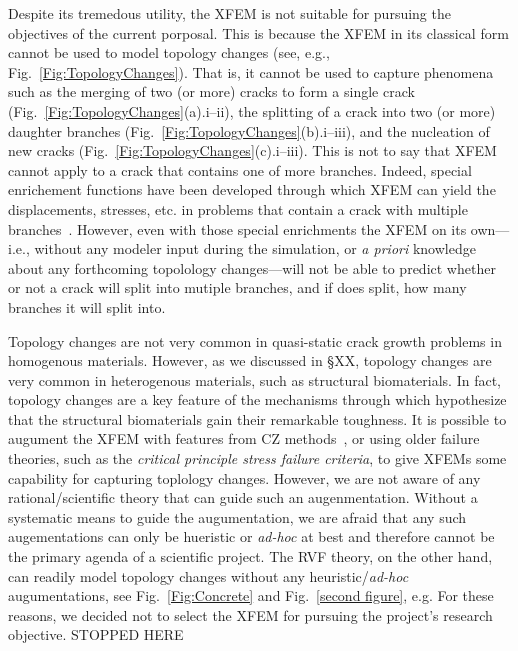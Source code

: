 \documentclass[12pt,onecolumn]{article}
\begin{document}
Despite its tremedous utility,  the XFEM is not suitable for pursuing the objectives of the current porposal.
This is  because  the XFEM in its classical form cannot  be used to  model topology changes (see, e.g., Fig.~\ref{Fig:TopologyChanges}). That is, it cannot  be used to capture phenomena such as  the merging of two (or more)  cracks to  form a single crack (Fig.~\ref{Fig:TopologyChanges}(a).i--ii), the splitting of a crack into two (or more)  daughter branches (Fig.~\ref{Fig:TopologyChanges}(b).i--iii), and  the nucleation of new cracks (Fig.~\ref{Fig:TopologyChanges}(c).i--iii).  This is not to say that XFEM cannot  apply to a crack that contains one of more branches. Indeed, special  enrichement functions have been developed through which  XFEM  can yield  the  displacements, stresses, etc.  in  problems that contain a crack with  multiple branches~\cite{daux2000arbitrary,belytschko2001arbitrary}. However, even  with those special enrichments  the XFEM  on its own---i.e., without any modeler input during the simulation, or \textit{a priori} knowledge about any  forthcoming topolology changes---will not be able to predict whether or not a  crack will split into mutiple branches, and if does split, how many branches it will split into.%


Topology changes are not very common in quasi-static crack growth problems in homogenous materials. However, as we discussed in \S XX,  topology changes are very common in heterogenous materials, such  as structural biomaterials. In fact,  topology changes are a key feature of the  mechanisms  through which  hypothesize that the structural biomaterials  gain their remarkable   toughness. It is possible to augument the XFEM with features from  CZ methods~\cite{wells2001new,moes2002extended,mariani2003extended}, or using older failure theories, such as the  \textit{critical principle stress failure criteria}, to give XFEMs some capability  for capturing toplology changes. However, we are not aware of any rational/scientific  theory that can guide such an augenmentation. Without a systematic means  to  guide the augumentation, we are afraid  that any such augementations can only be  hueristic or \textit{ad-hoc}  at best and therefore cannot be the primary agenda of a scientific project. The  RVF theory, on the other hand, can readily model topology  changes without any heuristic/\textit{ad-hoc} augumentations, see  Fig.~\ref{Fig:Concrete} and Fig.~\ref{second figure}, e.g.   For these reasons, we decided not to select the XFEM for  pursuing  the  project's research objective.
STOPPED HERE
\end{document}
